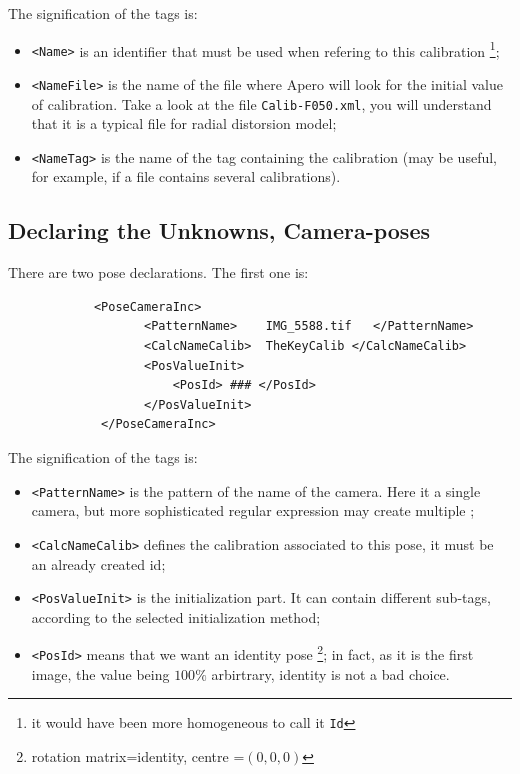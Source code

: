 The signification of the tags is:

\begin{itemize}
   \item {\tt <Name>} is an identifier that must  be used when refering to this calibration
         \footnote{it would have been more homogeneous to call it {\tt Id} };

   \item {\tt <NameFile>} is the name of the file where Apero will look for
         the initial value of calibration. Take a look at the file {\tt Calib-F050.xml},
         you will understand that it is a typical file for radial distorsion model;

   \item {\tt <NameTag>} is the name of the tag containing the calibration (may be useful,
         for example, if a file contains several calibrations).
\end{itemize}





\subsection{Declaring the Unknowns, Camera-poses}

There are two pose declarations. The first one is:
{\scriptsize
\begin{verbatim}
            <PoseCameraInc>
                   <PatternName>    IMG_5588.tif   </PatternName>
                   <CalcNameCalib>  TheKeyCalib </CalcNameCalib>
                   <PosValueInit>
                       <PosId> ### </PosId>
                   </PosValueInit>
             </PoseCameraInc>
\end{verbatim}
}

The signification of the tags is:

\begin{itemize}
   \item {\tt <PatternName>} is the pattern of the name of the camera. Here
         it  a single camera, but more sophisticated regular expression
         may create multiple ;

   \item {\tt <CalcNameCalib>} defines the calibration associated to this pose,
         it must be an already created id;

    \item {\tt <PosValueInit>} is the initialization part. It can contain
          different sub-tags, according to the selected initialization method;
         
    \item {\tt <PosId>} means that we want an identity pose 
          \footnote{rotation matrix=identity, centre =$(0,0,0)$};
           in fact, as it is the first image, the value being $100\%$ arbirtrary,
           identity is not a bad choice.
            
\end{itemize}


